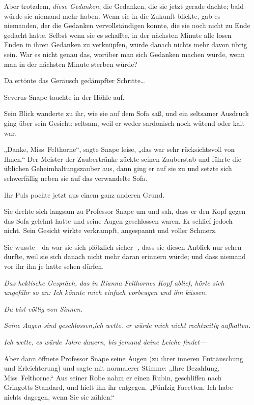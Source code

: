 {Aber trotzdem, \emph{diese Gedanken}, die Gedanken, die sie jetzt gerade dachte; bald würde sie niemand mehr haben. Wenn sie in die Zukunft blickte, gab es niemanden, der die Gedanken vervollständigen konnte, die sie noch nicht zu Ende gedacht hatte. Selbst wenn sie es schaffte, in der nächsten Minute alle losen Enden in ihren Gedanken zu verknüpfen, würde danach nichts mehr davon übrig sein. War es nicht genau das, worüber man sich Gedanken machen würde, wenn man in der nächsten Minute sterben würde?

Da ertönte das Geräusch gedämpfter Schritte…

Severus Snape tauchte in der Höhle auf.

Sein Blick wanderte zu ihr, wie sie auf dem Sofa saß, und ein seltsamer Ausdruck ging über sein Gesicht; seltsam, weil er weder sardonisch noch wütend oder kalt war.

„Danke, Miss~Felthorne“, sagte Snape leise, „das war sehr rücksichtsvoll von Ihnen.“ Der Meister der Zaubertränke zückte seinen Zauberstab und führte die üblichen Geheimhaltungszauber aus, dann ging er auf sie zu und setzte sich schwerfällig neben sie auf das verwandelte Sofa.

Ihr Puls pochte jetzt aus einem ganz anderen Grund.

Sie drehte sich langsam zu Professor Snape um und sah, dass er den Kopf gegen das Sofa gelehnt hatte und seine Augen geschlossen waren. Er schlief jedoch nicht. Sein Gesicht wirkte verkrampft, angespannt und voller Schmerz.

Sie wusste—da war sie sich plötzlich sicher -, dass sie diesen Anblick nur sehen durfte, weil sie sich danach nicht mehr daran erinnern würde; und dass niemand vor ihr ihn je hatte sehen dürfen.

\emph{Das hektische Gespräch, das in Rianna Felthornes Kopf ablief, hörte sich ungefähr so an: \emph{Ich könnte mich einfach vorbeugen und ihn küssen.}}

\emph{\emph{Du bist völlig von Sinnen.}}

\emph{\emph{Seine Augen sind geschlossen,ich wette, er würde mich nicht rechtzeitig aufhalten.}}

\emph{Ich wette, es würde Jahre dauern, bis jemand deine Leiche findet—}

Aber dann öffnete Professor Snape seine Augen (zu ihrer inneren Enttäuschung und Erleichterung) und sagte mit normalerer Stimme: „Ihre Bezahlung, Miss~Felthorne.“ Aus seiner Robe nahm er einen Rubin, geschliffen nach Gringotts-Standard, und hielt ihn ihr entgegen. „Fünfzig Facetten. Ich habe nichts dagegen, wenn Sie sie zählen.“

}
